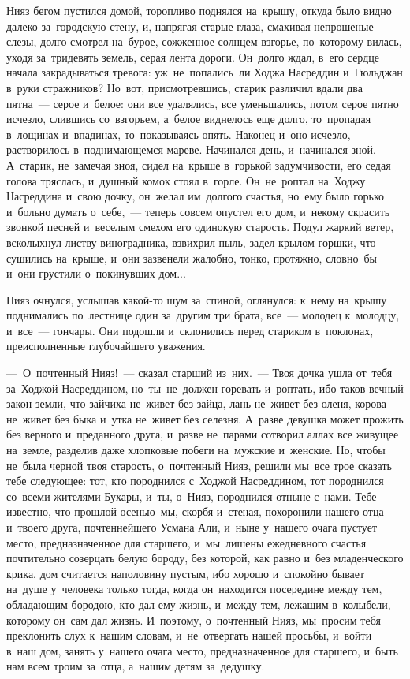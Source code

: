 \documentclass[12pt,a4paper]{book}
\begin{document}
Нияз бегом пустился домой, торопливо поднялся на~крышу, откуда было видно далеко за~городскую стену, и, напрягая старые глаза, смахивая непрошеные слезы, долго смотрел на~бурое, сожженное солнцем взгорье, по~которому вилась, уходя за~тридевять земель, серая лента дороги. Он~долго ждал, в~его сердце начала закрадываться тревога: уж~не~попались~ли Ходжа Насреддин и~Гюльджан в~руки стражников? Но~вот, присмотревшись, старик различил вдали два пятна~— серое и~белое: они все удалялись, все уменьшались, потом серое пятно исчезло, слившись со~взгорьем, а~белое виднелось еще долго, то~пропадая в~лощинах и~впадинах, то~показываясь опять. Наконец и~оно исчезло, растворилось в~поднимающемся мареве. Начинался день, и~начинался зной. А~старик, не~замечая зноя, сидел на~крыше в~горькой задумчивости, его седая голова тряслась, и~душный комок стоял в~горле. Он~не~роптал на~Ходжу Насреддина и~свою дочку, он~желал им~долгого счастья, но~ему было горько и~больно думать о~себе,~— теперь совсем опустел его дом, и~некому скрасить звонкой песней и~веселым смехом его одинокую старость. Подул жаркий ветер, всколыхнул листву виноградника, взвихрил пыль, задел крылом горшки, что сушились на~крыше, и~они зазвенели жалобно, тонко, протяжно, словно~бы и~они грустили о~покинувших дом...

Нияз очнулся, услышав какой-то шум за~спиной, оглянулся: к~нему на~крышу поднимались по~лестнице один за~другим три брата, все~— молодец к~молодцу, и~все~— гончары. Они подошли и~склонились перед стариком в~поклонах, преисполненные глубочайшего уважения.

—~О~почтенный Нияз!~— сказал старший из~них.~— Твоя дочка ушла от~тебя за~Ходжой Насреддином, но~ты~не~должен горевать и~роптать, ибо таков вечный закон земли, что зайчиха не~живет без зайца, лань не~живет без оленя, корова не~живет без быка и~утка не~живет без селезня. А~разве девушка может прожить без верного и~преданного друга, и~разве не~парами сотворил аллах все живущее на~земле, разделив даже хлопковые побеги на~мужские и~женские. Но, чтобы не~была черной твоя старость, о~почтенный Нияз, решили мы~все трое сказать тебе следующее: тот, кто породнился с~Ходжой Насреддином, тот породнился со~всеми жителями Бухары, и~ты, о~Нияз, породнился отныне с~нами. Тебе известно, что прошлой осенью~мы, скорбя и~стеная, похоронили нашего отца и~твоего друга, почтеннейшего Усмана Али, и~ныне у~нашего очага пустует место, предназначенное для старшего, и~мы~лишены ежедневного счастья почтительно созерцать белую бороду, без которой, как равно и~без младенческого крика, дом считается наполовину пустым, ибо хорошо и~спокойно бывает на~душе у~человека только тогда, когда он~находится посередине между тем, обладающим бородою, кто дал ему жизнь, и~между тем, лежащим в~колыбели, которому он~сам дал жизнь. И~поэтому, о~почтенный Нияз, мы~просим тебя преклонить слух к~нашим словам, и~не~отвергать нашей просьбы, и~войти в~наш дом, занять у~нашего очага место, предназначенное для старшего, и~быть нам всем троим за~отца, а~нашим детям за~дедушку.
\end{document}
